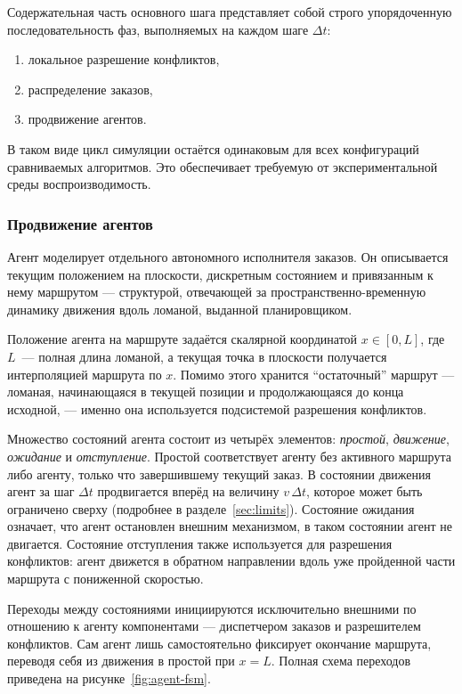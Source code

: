 Содержательная часть основного шага представляет собой строго упорядоченную
последовательность фаз, выполняемых на каждом шаге $\Delta t$:

\begin{enumerate}
\item локальное разрешение конфликтов,
\item распределение заказов,
\item продвижение агентов.
\end{enumerate}

В таком виде цикл симуляции остаётся одинаковым для всех конфигураций сравниваемых алгоритмов.
Это обеспечивает требуемую от экспериментальной среды воспроизводимость.

\subsubsection{Продвижение агентов}

Агент моделирует отдельного автономного исполнителя заказов. Он
описывается текущим положением на плоскости, дискретным состоянием и привязанным
к нему маршрутом --- структурой, отвечающей за пространственно-временную
динамику движения вдоль ломаной, выданной планировщиком.

Положение агента на маршруте задаётся
скалярной координатой $x \in [0, L]$, где $L$~--- полная длина ломаной, а текущая точка
в плоскости получается интерполяцией маршрута по $x$. Помимо этого хранится 
\enquote{остаточный} маршрут ---
ломаная, начинающаяся в текущей позиции и продолжающаяся до конца исходной, --- именно она
используется подсистемой разрешения конфликтов.

Множество состояний агента состоит из четырёх элементов: \emph{простой}, \emph{движение},
\emph{ожидание} и \emph{отступление}. Простой соответствует агенту без активного маршрута либо
агенту, только что завершившему текущий заказ. В состоянии движения агент за шаг
$\Delta t$ продвигается вперёд на величину $v \, \Delta t$, которое может быть ограничено сверху 
(подробнее в разделе~\ref{sec:limits}). 
Состояние ожидания означает, что агент остановлен внешним механизмом, в таком состоянии агент не двигается. 
Состояние отступления также используется для разрешения
конфликтов: агент движется в обратном направлении вдоль уже пройденной части маршрута
с пониженной скоростью.

Переходы между состояниями инициируются исключительно внешними по отношению к агенту
компонентами --- диспетчером заказов и разрешителем конфликтов. Сам агент лишь
самостоятельно фиксирует окончание маршрута, переводя себя из движения в простой при
$x = L$. Полная схема переходов приведена на рисунке~\ref{fig:agent-fsm}.


